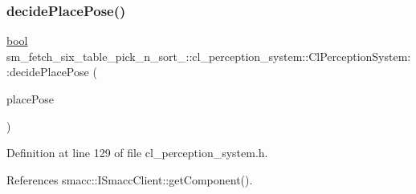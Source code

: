 \subsubsection{\texorpdfstring{decide\+Place\+Pose()}{decidePlacePose()}}
{\footnotesize\ttfamily \hyperlink{classbool}{bool} sm\+\_\+fetch\+\_\+six\+\_\+table\+\_\+pick\+\_\+n\+\_\+sort\+\_\+::cl\+\_\+perception\+\_\+system\+::\+Cl\+Perception\+System\+::decide\+Place\+Pose (\begin{DoxyParamCaption}\item[{geometry\+\_\+msgs\+::\+Pose\+Stamped \&}]{place\+Pose }\end{DoxyParamCaption})\hspace{0.3cm}{\ttfamily [inline]}}



Definition at line 129 of file cl\+\_\+perception\+\_\+system.\+h.



References smacc\+::\+I\+Smacc\+Client\+::get\+Component().


